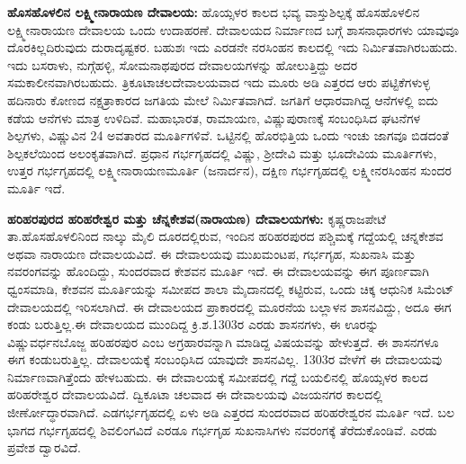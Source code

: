 \textbf{ಹೊಸಹೊಳಲಿನ ಲಕ್ಷ್ಮೀನಾರಾಯಣ ದೇವಾಲಯ:} ಹೊಯ್ಸಳರ ಕಾಲದ ಭವ್ಯ ವಾಸ್ತುಶಿಲ್ಪಕ್ಕೆ ಹೊಸಹೊಳಲಿನ ಲಕ್ಷ್ಮೀನಾರಾಯಣ ದೇವಾಲಯ ಒಂದು ಉದಾಹರಣೆ. ದೇವಾಲಯದ ನಿರ್ಮಾಣದ ಬಗ್ಗೆ ಶಾಸನಾಧಾರಗಳು ಯಾವುವೂ ದೊರಕಿಲ್ಲದಿರುವುದು ದುರಾದೃಷ್ಟಕರ. ಬಹುಶಃ ಇದು ಎರಡನೇ ನರಸಿಂಹನ ಕಾಲದಲ್ಲಿ ಇದು ನಿರ್ಮಿತವಾಗಿರಬಹುದು. ಇದು ಬಸರಾಳು, ನುಗ್ಗೆಹಳ್ಳಿ, ಸೋಮನಾಥಪುರದ ದೇವಾಲಯಗಳನ್ನು ಹೋಲುತ್ತಿದ್ದು ಅದರ ಸಮಕಾಲೀನವಾಗಿರಬಹುದು. ತ್ರಿಕೂಟಾಚಲದೇವಾಲಯವಾದ ಇದು ಮೂರು ಅಡಿ ಎತ್ತರದ ಆರು ಪಟ್ಟಿಕೆಗಳುಳ್ಳ ಹದಿನಾರು ಕೋಣದ ನಕ್ಷತ್ರಾಕಾರದ ಜಗತಿಯ ಮೇಲೆ ನಿರ್ಮಿತವಾಗಿದೆ. ಜಗತಿಗೆ ಆಧಾರವಾಗಿದ್ದ ಆನೆಗಳಲ್ಲಿ ಐದು ಕಡೆಯ ಆನೆಗಳು ಮಾತ್ರ ಉಳಿದಿವೆ. ಮಹಾಭಾರತ, ರಾಮಾಯಣ, ವಿಷ್ಣುಪುರಾಣಕ್ಕೆ ಸಂಬಂಧಿಸಿದ ಘಟನೆಗಳ ಶಿಲ್ಪಗಳು, ವಿಷ್ಣುವಿನ 24 ಅವತಾರದ ಮೂರ್ತಿಗಳಿವೆ. ಒಟ್ಟಿನಲ್ಲಿ ಹೊರಭಿತ್ತಿಯ ಒಂದು ಇಂಚು ಜಾಗವೂ ಬಿಡದಂತೆ ಶಿಲ್ಪಕಲೆಯಿಂದ ಅಲಂಕೃತವಾಗಿದೆ. ಪ್ರಧಾನ ಗರ್ಭಗೃಹದಲ್ಲಿ ವಿಷ್ಣು, ಶ‍್ರೀದೇವಿ ಮತ್ತು ಭೂದೇವಿಯ ಮೂರ್ತಿಗಳು, ಉತ್ತರ ಗರ್ಭಗೃಹದಲ್ಲಿ ಲಕ್ಷ್ಮೀನಾರಾಯಣಮೂರ್ತಿ (ಜನಾರ್ದನ), ದಕ್ಷಿಣ ಗರ್ಭಗೃಹದಲ್ಲಿ ಲಕ್ಷ್ಮೀನರಸಿಂಹನ ಸುಂದರ ಮೂರ್ತಿ ಇದೆ.

\textbf{ಹರಿಹರಪುರದ ಹರಿಹರೇಶ್ವರ ಮತ್ತು ಚೆನ್ನಕೇಶವ(ನಾರಾಯಣ) ದೇವಾಲಯಗಳು:} ಕೃಷ್ಣರಾಜಪೇಟೆ ತಾ.\break ಹೊಸಹೊಳಲಿನಿಂದ ನಾಲ್ಕು ಮೈಲಿ ದೂರದಲ್ಲಿರುವ, ಇಂದಿನ ಹರಿಹರಪುರದ ಪಶ್ಚಿಮಕ್ಕೆ ಗದ್ದೆಯಲ್ಲಿ ಚನ್ನಕೇಶವ ಅಥವಾ ನಾರಾಯಣ ದೇವಾಲಯವಿದೆ. ಈ ದೇವಾಲಯವು ಮುಖಮಂಟಪ, ಗರ್ಭಗೃಹ, ಸುಖನಾಸಿ ಮತ್ತು ನವರಂಗವನ್ನು ಹೊಂದಿದ್ದು, ಸುಂದರವಾದ ಕೇಶವನ ಮೂರ್ತಿ ಇದೆ. ಈ ದೇವಾಲಯವನ್ನು ಈಗ ಪೂರ್ಣವಾಗಿ ಧ್ವಂಸಮಾಡಿ, ಕೇಶವನ ಮೂರ್ತಿಯನ್ನು ಸಮೀಪದ ಶಾಲಾ ಮೈದಾನದಲ್ಲಿ ಕಟ್ಟಿರುವ, ಒಂದು ಚಿಕ್ಕ ಆಧುನಿಕ ಸಿಮೆಂಟ್​ ದೇವಾಲಯದಲ್ಲಿ ಇರಿಸಲಾಗಿದೆ. ಈ ದೇವಾಲಯದ ಪ್ರಾಕಾರದಲ್ಲಿ ಮೂರನೆಯ ಬಲ್ಲಾಳನ ಶಾಸನವಿದ್ದು, ಅದೂ ಈಗ ಕಂಡು ಬರುತ್ತಿಲ್ಲ.ಈ ದೇವಾಲಯದ ಮುಂದಿದ್ದ ಕ್ರಿ.ಶ.1303ರ ಎರಡು ಶಾಸನಗಳು, ಈ ಊರನ್ನು ವಿಷ್ಣುವರ್ಧನಬೊಜ್ಜ ಹರಿಹರಪುರ ಎಂಬ ಅಗ್ರಹಾರವನ್ನಾಗಿ ಮಾಡಿದ್ದ ವಿಷಯವನ್ನು ಹೇಳುತ್ತದೆ. ಈ ಶಾಸನಗಳೂ ಈಗ ಕಂಡುಬರುತ್ತಿಲ್ಲ. ದೇವಾಲಯಕ್ಕೆ ಸಂಬಂಧಿಸಿದ ಯಾವುದೇ ಶಾಸನವಿಲ್ಲ. 1303ರ ವೇಳೆಗೆ ಈ ದೇವಾಲಯವು ನಿರ್ಮಾಣವಾಗಿತ್ತೆಂದು ಹೇಳಬಹುದು. ಈ ದೇವಾಲಯಕ್ಕೆ ಸಮೀಪದಲ್ಲಿ ಗದ್ದೆ ಬಯಲಿನಲ್ಲಿ ಹೊಯ್ಸಳರ ಕಾಲದ ಹರಿಹರೇಶ್ವರ ದೇವಾಲಯವಿದೆ. ದ್ವಿಕೂಟಾ ಚಲವಾದ ಈ ದೇವಾಲಯವು ವಿಜಯನಗರ ಕಾಲದಲ್ಲಿ ಜೀರ್ಣೋದ್ಧಾರವಾಗಿದೆ. ಎಡಗರ್ಭಗೃಹದಲ್ಲಿ ಏಳು ಅಡಿ ಎತ್ತರದ ಸುಂದರವಾದ ಹರಿಹರೇಶ್ವರನ ಮೂರ್ತಿ ಇದೆ. ಬಲ ಭಾಗದ ಗರ್ಭಗೃಹದಲ್ಲಿ ಶಿವಲಿಂಗವಿದೆ ಎರಡೂ ಗರ್ಭಗೃಹ ಸುಖನಾಸಿಗಳು ನವರಂಗಕ್ಕೆ ತೆರೆದುಕೊಂಡಿವೆ. ಎರಡು ಪ್ರವೇಶ ದ್ವಾರವಿದೆ.

